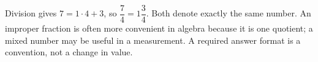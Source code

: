 Division gives $7=1\cdot4+3$, so $\dfrac{7}{4}=\boxed{1\dfrac{3}{4}}$. Both denote exactly the same number. An improper fraction is often more convenient in algebra because it is one quotient; a mixed number may be useful in a measurement. A required answer format is a convention, not a change in value.
